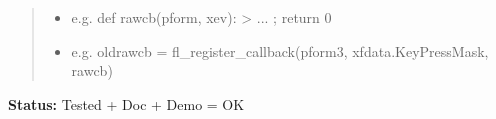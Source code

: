 \begin{boxedminipage}{\funcwidth}
\begin{quote}
\begin{itemize}
  \item
    \setlength{\parskip}{0.6ex}

e.g. def rawcb(pform, xev): > ... ; return 0


  \item 
e.g. oldrawcb = fl\_register\_callback(pform3, xfdata.KeyPressMask,
rawcb)


\end{itemize}

\end{quote}

\textbf{Status:} 
Tested + Doc + Demo = OK


    \end{boxedminipage}

    \label{xformslib:flbasic:fl_register_raw_callback}

    \vspace{0.5ex}

